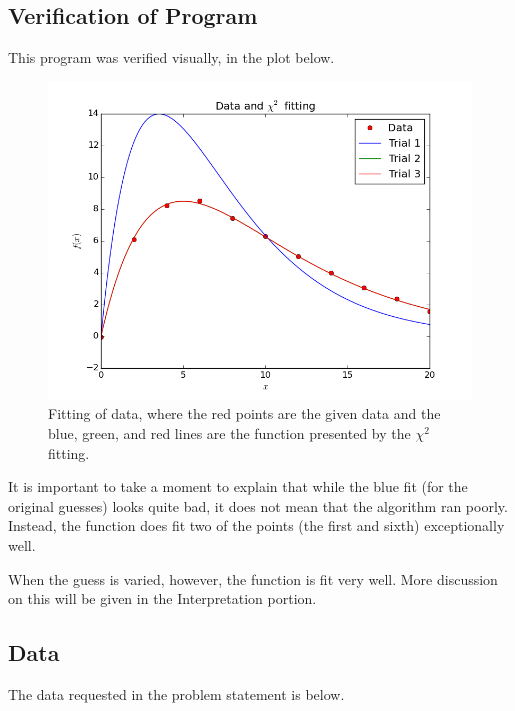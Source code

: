 \documentclass[10pt,letter]{article}
\begin{document}
\subsection{Verification of Program}

This program was verified visually, in the plot below.

\begin{figure}[h]
  \centering
    \includegraphics[width=.7\textwidth]{homework5_problem2_plot1}
  \caption{Fitting of data, where the red points are the given data and the blue, green, and red lines are the function presented by the $\chi^2$ fitting.}
\end{figure}

It is important to take a moment to explain that while the blue fit (for the original guesses) looks quite bad, it does not mean that the algorithm ran poorly. Instead, the function does fit two of the points (the first and sixth) exceptionally well.

When the guess is varied, however, the function is fit very well. More discussion on this will be given in the Interpretation portion.

\pagebreak
\subsection{Data}

The data requested in the problem statement is below.
\end{document}
